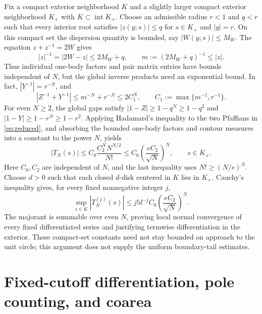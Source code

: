 \documentclass[11pt]{article}
\numberwithin{equation}{section}
\theoremstyle{definition}
\begin{document}
Fix a compact exterior neighborhood \(K\) and a slightly larger
compact exterior neighborhood \(K_+\) with
\(K\subset\operatorname{int}K_+\). Choose an admissible radius
\(r<1\) and \(q<r\) such that every interior root satisfies
\(|z(y;s)|\le q\) for \(s\in K_+\) and \(|y|=r\).
On this compact set the dispersion quantity is bounded, say
\(|W(y;s)|\le M_W\). The equation \(z+z^{-1}=2W\) gives
\[
 |z|^{-1}=|2W-z|\le 2M_W+q,
 \qquad m:=(2M_W+q)^{-1}\le |z|.
\]
Thus individual one-body factors and pair matrix entries have bounds
independent of \(N\), but the global inverse products need an
exponential bound. In fact, \(|Y^{-1}|=r^{-N}\), and
\[
 |Z^{-1}+Y^{-1}|\le m^{-N}+r^{-N}\le 2C_1^N,
 \qquad C_1:=\max\{m^{-1},r^{-1}\}.
\]
For even \(N\ge2\), the global gaps satisfy
\(|1-Z|\ge1-q^N\ge1-q^2\) and
\(|1-Y|\ge1-r^N\ge1-r^2\).
Applying Hadamard's inequality to the two Pfaffians in
\eqref{eq:reduced}, and absorbing the bounded one-body factors and
contour measures into a constant to the power \(N\), yields
\[
 |T_N(s)|\le C_0\frac{C_2^N N^{N/2}}{N!}
       \le C_0\left(\frac{eC_2}{\sqrt N}\right)^N,
 \qquad s\in K_+.
\]
Here \(C_0,C_2\) are independent of \(N\), and the last inequality
uses \(N!\ge(N/e)^N\).
Choose \(d>0\) such that each closed \(d\)-disk centered in \(K\)
lies in \(K_+\). Cauchy's inequality gives, for every fixed
nonnegative integer \(j\),
\[
 \sup_{s\in K}|T_N^{(j)}(s)|
 \le j!d^{-j}C_0\left(\frac{eC_2}{\sqrt N}\right)^N.
\]
The majorant is summable over even \(N\), proving local normal
convergence of every fixed differentiated series and justifying
termwise differentiation in the exterior. These compact-set
constants need not stay bounded on approach to the unit circle;
this argument does not supply the uniform boundary-tail estimates.



\section{Fixed-cutoff differentiation, pole counting, and coarea}
\label{app:lie}
\end{document}
